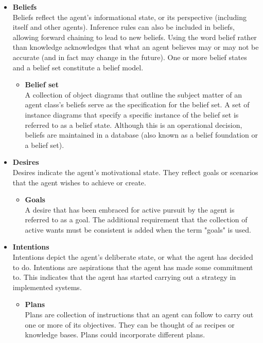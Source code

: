 \begin{itemize}
    \item \textbf{Beliefs} \\
    Beliefs reflect the agent's informational state, or its perspective (including itself and other agents). Inference rules can also be included in beliefs, allowing forward chaining to lead to new beliefs. Using the word belief rather than knowledge acknowledges that what an agent believes may or may not be accurate (and in fact may change in the future). One or more belief states and a belief set constitute a belief model.
 
    \begin{itemize}[label={}]
        \item \textbf{Belief set} \\
        A collection of object diagrams that outline the subject matter of an agent class's beliefs serve as the specification for the belief set. A set of instance diagrams that specify a specific instance of the belief set is referred to as a belief state. Although this is an operational decision, beliefs are maintained in a database (also known as a belief foundation or a belief set).
    \end{itemize}

\item \textbf{Desires} \\
Desires indicate the agent's motivational state. They reflect goals or scenarios that the agent wishes to achieve or create.

    \begin{itemize}[label={}]
        \item \textbf{Goals} \\
        A desire that has been embraced for active pursuit by the agent is referred to as a goal. The additional requirement that the collection of active wants must be consistent is added when the term "goals" is used.
    \end{itemize}

\item \textbf{Intentions} \\
Intentions depict the agent's deliberate state, or what the agent has decided to do. Intentions are aspirations that the agent has made some commitment to. This indicates that the agent has started carrying out a strategy in implemented systems.
    
    \begin{itemize}[label={}]
        \item \textbf{Plans} \\
        Plans are collection of instructions that an agent can follow to carry out one or more of its objectives. They can be thought of as recipes or knowledge bases. Plans could incorporate different plans.
    

\end{itemize}
\end{itemize}
